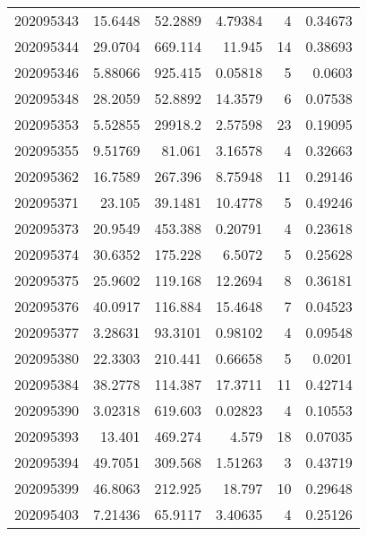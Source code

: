 \begin{tabular}{rrrrrr}
 202095343 &         15.6448  &       52.2889 &            4.79384 &           4 & 0.34673 \\
 202095344 &         29.0704  &      669.114  &           11.945   &          14 & 0.38693 \\
 202095346 &          5.88066 &      925.415  &            0.05818 &           5 & 0.0603  \\
 202095348 &         28.2059  &       52.8892 &           14.3579  &           6 & 0.07538 \\
 202095353 &          5.52855 &    29918.2    &            2.57598 &          23 & 0.19095 \\
 202095355 &          9.51769 &       81.061  &            3.16578 &           4 & 0.32663 \\
 202095362 &         16.7589  &      267.396  &            8.75948 &          11 & 0.29146 \\
 202095371 &         23.105   &       39.1481 &           10.4778  &           5 & 0.49246 \\
 202095373 &         20.9549  &      453.388  &            0.20791 &           4 & 0.23618 \\
 202095374 &         30.6352  &      175.228  &            6.5072  &           5 & 0.25628 \\
 202095375 &         25.9602  &      119.168  &           12.2694  &           8 & 0.36181 \\
 202095376 &         40.0917  &      116.884  &           15.4648  &           7 & 0.04523 \\
 202095377 &          3.28631 &       93.3101 &            0.98102 &           4 & 0.09548 \\
 202095380 &         22.3303  &      210.441  &            0.66658 &           5 & 0.0201  \\
 202095384 &         38.2778  &      114.387  &           17.3711  &          11 & 0.42714 \\
 202095390 &          3.02318 &      619.603  &            0.02823 &           4 & 0.10553 \\
 202095393 &         13.401   &      469.274  &            4.579   &          18 & 0.07035 \\
 202095394 &         49.7051  &      309.568  &            1.51263 &           3 & 0.43719 \\
 202095399 &         46.8063  &      212.925  &           18.797   &          10 & 0.29648 \\
 202095403 &          7.21436 &       65.9117 &            3.40635 &           4 & 0.25126 \\

\end{tabular}
